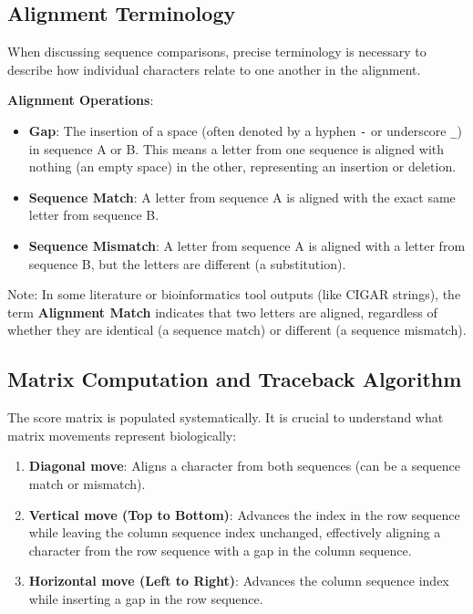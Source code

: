 \subsection{Alignment Terminology}
When discussing sequence comparisons, precise terminology is necessary to describe how individual characters relate to one another in the alignment.

\begin{important}
  \textbf{Alignment Operations}:
  \begin{itemize}
      \item \textbf{Gap}: The insertion of a space (often denoted by a hyphen \texttt{-} or underscore \texttt{\_}) in sequence A or B. This means a letter from one sequence is aligned with nothing (an empty space) in the other, representing an insertion or deletion.
      \item \textbf{Sequence Match}: A letter from sequence A is aligned with the exact same letter from sequence B.
      \item \textbf{Sequence Mismatch}: A letter from sequence A is aligned with a letter from sequence B, but the letters are different (a substitution).
  \end{itemize}
  \sta Note: In some literature or bioinformatics tool outputs (like CIGAR strings), the term \textbf{Alignment Match} indicates that two letters are aligned, regardless of whether they are identical (a sequence match) or different (a sequence mismatch).
\end{important}

\subsection{Matrix Computation and Traceback Algorithm}
The score matrix is populated systematically.
\sta It is crucial to understand what matrix movements represent biologically:
\begin{enumerate}
    \item \textbf{Diagonal move}: Aligns a character from both sequences (can be a sequence match or mismatch).
    \item \textbf{Vertical move (Top to Bottom)}: Advances the index in the row sequence while leaving the column sequence index unchanged, effectively aligning a character from the row sequence with a gap in the column sequence.
    \item \textbf{Horizontal move (Left to Right)}: Advances the column sequence index while inserting a gap in the row sequence.
\end{enumerate}

